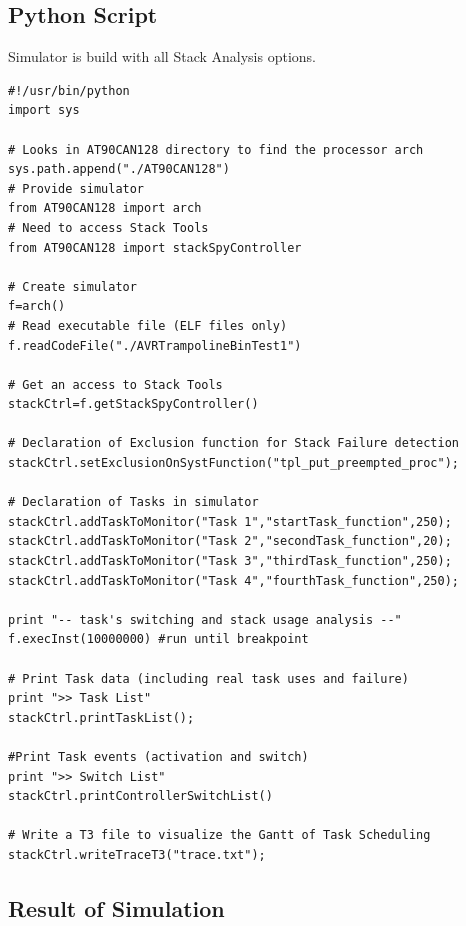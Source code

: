 \subsection{Python Script}
Simulator is build with all Stack Analysis options.
\lstset{language=python}
\begin{lstlisting}
#!/usr/bin/python
import sys

# Looks in AT90CAN128 directory to find the processor arch
sys.path.append("./AT90CAN128")
# Provide simulator
from AT90CAN128 import arch	
# Need to access Stack Tools
from AT90CAN128 import stackSpyController

# Create simulator 
f=arch()
# Read executable file (ELF files only)
f.readCodeFile("./AVRTrampolineBinTest1")					

# Get an access to Stack Tools
stackCtrl=f.getStackSpyController()				

# Declaration of Exclusion function for Stack Failure detection
stackCtrl.setExclusionOnSystFunction("tpl_put_preempted_proc");

# Declaration of Tasks in simulator
stackCtrl.addTaskToMonitor("Task 1","startTask_function",250);
stackCtrl.addTaskToMonitor("Task 2","secondTask_function",20);
stackCtrl.addTaskToMonitor("Task 3","thirdTask_function",250);
stackCtrl.addTaskToMonitor("Task 4","fourthTask_function",250);

print "-- task's switching and stack usage analysis --"
f.execInst(10000000) #run until breakpoint

# Print Task data (including real task uses and failure)
print ">> Task List"
stackCtrl.printTaskList();

#Print Task events (activation and switch)
print ">> Switch List"
stackCtrl.printControllerSwitchList()

# Write a T3 file to visualize the Gantt of Task Scheduling
stackCtrl.writeTraceT3("trace.txt");
\end{lstlisting}

\subsection{Result of Simulation}


